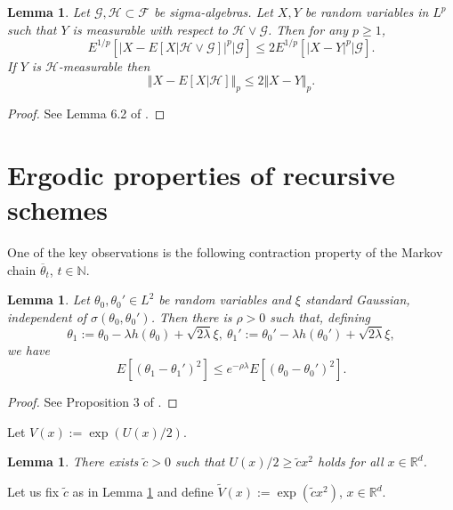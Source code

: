 \documentclass[a4paper,draft]{article}
\newtheorem{lemma}[theorem]{Lemma}
\begin{document}
\begin{lemma}\label{mall} Let $\mathcal{G},\mathcal{H}\subset\mathcal{F}$
be sigma-algebras. Let $X,Y$ be random variables in $L^p$ such that $Y$ is measurable with
	respect to $\mathcal{H}\vee\mathcal{G}$.
	Then for any $p\ge 1$,
	$$
	E^{1/p}\left[\vert X-E[X\vert\mathcal{H}\vee\mathcal{G}]\vert^p\big\vert \mathcal{G}\right]
	\leq 2E^{1/p}\left[\vert X-Y\vert^p\big\vert \mathcal{G}\right].
	$$
	If $Y$ is $\mathcal{H}$-measurable then
	\begin{equation}\label{dirk}
	\Vert X-E[X\vert\mathcal{H}]\Vert_p\leq 2 \Vert X-Y\Vert_p.
	\end{equation}
\end{lemma}
\begin{proof} See Lemma 6.2 of \cite{4}.
\end{proof}





\section{Ergodic properties of recursive schemes}

One of the key observations is the following contraction property
of the Markov chain $\overline{\theta}_t$, $t\in\mathbb{N}$.

\begin{lemma}\label{ghibli}
Let $\theta_0,\theta_0'\in L^2$ be random variables and $\xi$ standard
Gaussian, independent of $\sigma(\theta_0,\theta_0')$. 
Then there is $\rho>0$
such that, defining
$$
\theta_1:=\theta_0-\lambda h(\theta_0)+\sqrt{2\lambda}\xi,\
\theta_1':=\theta_0'-\lambda h(\theta_0')+\sqrt{2\lambda}\xi,
$$
we have
$$
E[(\theta_1-\theta_1')^2]\leq e^{-\rho\lambda}E[(\theta_0-\theta_0')^2].
$$
\end{lemma}
\begin{proof}
See Proposition 3 of \cite{durmus-moulines}.
\end{proof}

Let $V(x):=\exp(U(x)/2)$.
\begin{lemma}\label{tilda} There exists $\tilde{c}>0$ such that $U(x)/2\geq \tilde{c}x^2$
holds for all $x\in\mathbb{R}^d$.
\end{lemma}

Let us fix $\tilde{c}$ as in Lemma \ref{tilda} and define $\tilde{V}(x):=
\exp(\tilde{c}x^2)$, $x\in\mathbb{R}^d$. 
\end{document}
